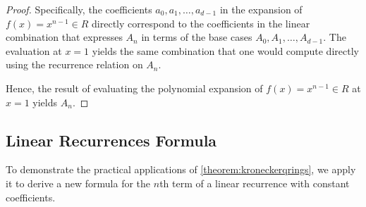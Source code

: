 \documentclass[11pt,reqno]{article}
\theoremstyle{plain}
\theoremstyle{definition}
\begin{document}
\begin{proof}
Specifically, the coefficients $a_0, a_1, \ldots, a_{d-1}$ in the expansion of $f(x) = x^{n-1} \in R$ directly correspond to the coefficients in the linear combination that expresses $A_n$ in terms of the base cases $A_0, A_1, \ldots, A_{d-1}$. The evaluation at $x=1$ yields the same combination that one would compute directly using the recurrence relation on $A_n$.

Hence, the result of evaluating the polynomial expansion of $f(x) = x^{n-1} \in R$ at $x=1$ yields $A_n$.
\end{proof}

\subsection{Linear Recurrences Formula}
To demonstrate the practical applications of \cref{theorem:kroneckerqrings}, we apply it to derive a new formula for the $n$th term of a linear recurrence with constant coefficients.
\end{document}
